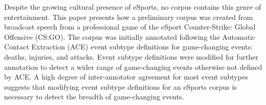 Despite the growing cultural presence of eSports, no corpus contains this genre of entertainment. This paper presents how a preliminary corpus was created from broadcast speech from a professional game of the eSport Counter-Strike: Global Offensive (CS:GO). The corpus was initially annotated following the Automatic Contact Extraction (ACE) event subtype definitions for game-changing events: deaths, injuries, and attacks. Event subtype definitions were modified for further annotation to detect a wider range of game-changing events otherwise not defined by ACE. A high degree of inter-annotator agreement for most event subtypes suggests that modifying event subtype definitions for an eSports corpus is necessary to detect the breadth of game-changing events.
